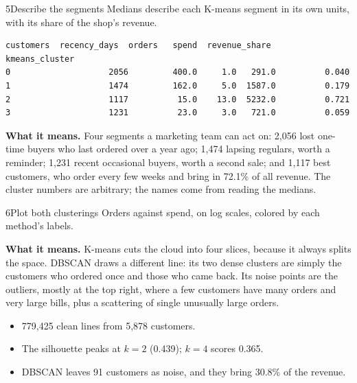 \begin{labquestion}{5}{Describe the segments}
Medians describe each K-means segment in its own units, with its share of the shop's revenue.
\end{labquestion}
\begin{labanswer}

\begin{refoutput}
\begin{lstlisting}[style=utpterminal]
                customers  recency_days  orders   spend  revenue_share
kmeans_cluster
0                    2056         400.0     1.0   291.0          0.040
1                    1474         162.0     5.0  1587.0          0.179
2                    1117          15.0    13.0  5232.0          0.721
3                    1231          23.0     3.0   721.0          0.059
\end{lstlisting}
\end{refoutput}

\textbf{What it means.} Four segments a marketing team can act on: 2,056 lost one-time buyers who last ordered over a year ago; 1,474 lapsing regulars, worth a reminder; 1,231 recent occasional buyers, worth a second sale; and 1,117 best customers, who order every few weeks and bring in 72.1\% of all revenue. The cluster numbers are arbitrary; the names come from reading the medians.
\end{labanswer}

\begin{labquestion}{6}{Plot both clusterings}
Orders against spend, on log scales, colored by each method's labels.
\end{labquestion}
\begin{labanswer}


\textbf{What it means.} K-means cuts the cloud into four slices, because it always splits the space. DBSCAN draws a different line: its two dense clusters are simply the customers who ordered once and those who came back. Its noise points are the outliers, mostly at the top right, where a few customers have many orders and very large bills, plus a scattering of single unusually large orders.
\end{labanswer}

\begin{labcheckpoint}
\begin{itemize}[leftmargin=1.2em,itemsep=2pt,topsep=1pt]
  \item 779,425 clean lines from 5,878 customers.
  \item The silhouette peaks at $k=2$ (0.439); $k=4$ scores 0.365.
  \item DBSCAN leaves 91 customers as noise, and they bring 30.8\% of the revenue.
\end{itemize}
\end{labcheckpoint}

